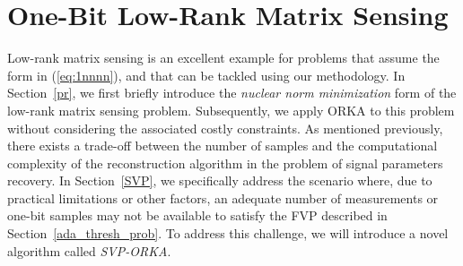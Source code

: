 \documentclass[12pt,draftcls,onecolumn]{IEEEtran}
\newcommand{\Fr}[1]{\textcolor{blue}{#1}}
\begin{document}
\section{One-Bit Low-Rank Matrix Sensing}
\label{MATRIX}
Low-rank matrix sensing is an excellent example for problems that assume the form in (\ref{eq:1nnnn}), and that can be tackled using our methodology. In Section~\ref{pr}, we first briefly introduce the \emph{nuclear norm minimization} form of the low-rank matrix sensing problem. Subsequently, we apply ORKA to this problem without considering the associated costly constraints. 
As mentioned previously, there exists a trade-off between the number of samples and the computational complexity of the reconstruction algorithm in the problem of signal parameters recovery. In 
Section~\ref{SVP}, we specifically address the scenario where, due to practical limitations or other factors, an adequate number of measurements or one-bit samples may not be available to satisfy the FVP described in Section~\ref{ada_thresh_prob}. To address this challenge, we will introduce a novel algorithm called \emph{SVP-ORKA}.
\end{document}
